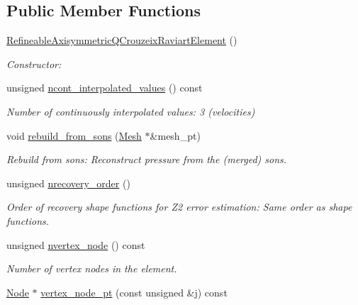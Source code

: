 \subsection*{Public Member Functions}
\begin{DoxyCompactItemize}
\item 
\hyperlink{classoomph_1_1RefineableAxisymmetricQCrouzeixRaviartElement_a170435912237a7b7a7b79f89d18da149}{Refineable\+Axisymmetric\+Q\+Crouzeix\+Raviart\+Element} ()
\begin{DoxyCompactList}\small\item\em Constructor\+: \end{DoxyCompactList}\item 
unsigned \hyperlink{classoomph_1_1RefineableAxisymmetricQCrouzeixRaviartElement_a8ec04aa9fe1b416afd6fadcbc571d47e}{ncont\+\_\+interpolated\+\_\+values} () const
\begin{DoxyCompactList}\small\item\em Number of continuously interpolated values\+: 3 (velocities) \end{DoxyCompactList}\item 
void \hyperlink{classoomph_1_1RefineableAxisymmetricQCrouzeixRaviartElement_a3e7a9653e5156860ea021c7ec151690f}{rebuild\+\_\+from\+\_\+sons} (\hyperlink{classoomph_1_1Mesh}{Mesh} $\ast$\&mesh\+\_\+pt)
\begin{DoxyCompactList}\small\item\em Rebuild from sons\+: Reconstruct pressure from the (merged) sons. \end{DoxyCompactList}\item 
unsigned \hyperlink{classoomph_1_1RefineableAxisymmetricQCrouzeixRaviartElement_a644f9d24915f1fb952b8746581f69ee3}{nrecovery\+\_\+order} ()
\begin{DoxyCompactList}\small\item\em Order of recovery shape functions for Z2 error estimation\+: Same order as shape functions. \end{DoxyCompactList}\item 
unsigned \hyperlink{classoomph_1_1RefineableAxisymmetricQCrouzeixRaviartElement_a45ed9a2e816c20c88fd9f375899657c3}{nvertex\+\_\+node} () const
\begin{DoxyCompactList}\small\item\em Number of vertex nodes in the element. \end{DoxyCompactList}\item 
\hyperlink{classoomph_1_1Node}{Node} $\ast$ \hyperlink{classoomph_1_1RefineableAxisymmetricQCrouzeixRaviartElement_a9d6988c1e72c26c9279dad476eb5cdde}{vertex\+\_\+node\+\_\+pt} (const unsigned \&j) const

\end{DoxyCompactItemize}
